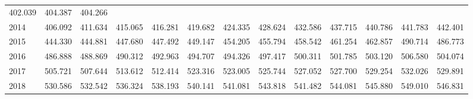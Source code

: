 \begin{tabular}{lllllllllllll}
  \multicolumn{1}{r}{402.039} &
  \multicolumn{1}{r}{404.387} &
  \multicolumn{1}{r}{404.266} \\
\multicolumn{1}{l}{\hspace{1em}2014} &
  \multicolumn{1}{|r}{406.092} &
  \multicolumn{1}{r}{411.634} &
  \multicolumn{1}{r}{415.065} &
  \multicolumn{1}{r}{416.281} &
  \multicolumn{1}{r}{419.682} &
  \multicolumn{1}{r}{424.335} &
  \multicolumn{1}{r}{428.624} &
  \multicolumn{1}{r}{432.586} &
  \multicolumn{1}{r}{437.715} &
  \multicolumn{1}{r}{440.786} &
  \multicolumn{1}{r}{441.783} &
  \multicolumn{1}{r}{442.401} \\
\multicolumn{1}{l}{\hspace{1em}2015} &
  \multicolumn{1}{|r}{444.330} &
  \multicolumn{1}{r}{444.881} &
  \multicolumn{1}{r}{447.680} &
  \multicolumn{1}{r}{447.492} &
  \multicolumn{1}{r}{449.147} &
  \multicolumn{1}{r}{454.205} &
  \multicolumn{1}{r}{455.794} &
  \multicolumn{1}{r}{458.542} &
  \multicolumn{1}{r}{461.254} &
  \multicolumn{1}{r}{462.857} &
  \multicolumn{1}{r}{490.714} &
  \multicolumn{1}{r}{486.773} \\
\multicolumn{1}{l}{\hspace{1em}2016} &
  \multicolumn{1}{|r}{486.888} &
  \multicolumn{1}{r}{488.869} &
  \multicolumn{1}{r}{490.312} &
  \multicolumn{1}{r}{492.963} &
  \multicolumn{1}{r}{494.707} &
  \multicolumn{1}{r}{494.326} &
  \multicolumn{1}{r}{497.417} &
  \multicolumn{1}{r}{500.311} &
  \multicolumn{1}{r}{501.785} &
  \multicolumn{1}{r}{503.120} &
  \multicolumn{1}{r}{506.580} &
  \multicolumn{1}{r}{504.074} \\
\multicolumn{1}{l}{\hspace{1em}2017} &
  \multicolumn{1}{|r}{505.721} &
  \multicolumn{1}{r}{507.644} &
  \multicolumn{1}{r}{513.612} &
  \multicolumn{1}{r}{512.414} &
  \multicolumn{1}{r}{523.316} &
  \multicolumn{1}{r}{523.005} &
  \multicolumn{1}{r}{525.744} &
  \multicolumn{1}{r}{527.052} &
  \multicolumn{1}{r}{527.700} &
  \multicolumn{1}{r}{529.254} &
  \multicolumn{1}{r}{532.026} &
  \multicolumn{1}{r}{529.891} \\
\multicolumn{1}{l}{\hspace{1em}2018} &
  \multicolumn{1}{|r}{530.586} &
  \multicolumn{1}{r}{532.542} &
  \multicolumn{1}{r}{536.324} &
  \multicolumn{1}{r}{538.193} &
  \multicolumn{1}{r}{540.141} &
  \multicolumn{1}{r}{541.081} &
  \multicolumn{1}{r}{543.818} &
  \multicolumn{1}{r}{541.482} &
  \multicolumn{1}{r}{544.081} &
  \multicolumn{1}{r}{545.880} &
  \multicolumn{1}{r}{549.010} &
  \multicolumn{1}{r}{546.831} \\

\end{tabular}
